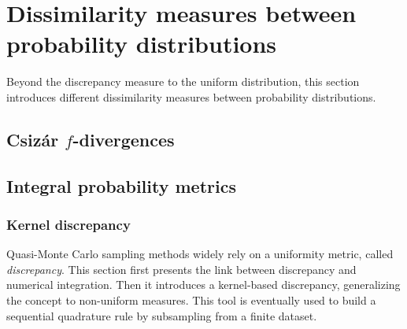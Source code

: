 \cleardoublepage
\chapter{Dissimilarity measures between probability distributions}
\label{apx:B}

Beyond the discrepancy measure to the uniform distribution, this section introduces different dissimilarity measures between probability distributions. 

\section{Csiz\'{a}r $f$-divergences}




\section{Integral probability metrics}






\subsection{Kernel discrepancy}
Quasi-Monte Carlo sampling methods widely rely on a uniformity metric, called \textit{discrepancy}. 
This section first presents the link between discrepancy and numerical integration. 
Then it introduces a kernel-based discrepancy, generalizing the concept to non-uniform measures. 
This tool is eventually used to build a sequential quadrature rule by subsampling from a finite dataset.




